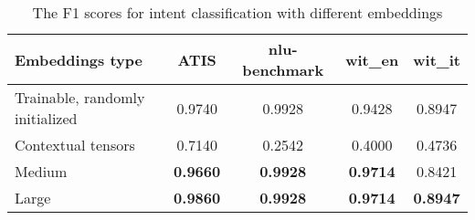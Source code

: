
\begin{table}
	\begin{tabularx}{\textwidth}{Lcccc}
		\toprule
		\textbf{Embeddings type} & \textbf{ATIS} & \textbf{nlu-benchmark} & \textbf{wit\_en} & \textbf{wit\_it} \\
		\midrule
		Trainable, randomly initialized & 0.9740 & 0.9928 & 0.9428 & 0.8947 \\
		\midrule
		Contextual tensors & 0.7140 & 0.2542 & 0.4000 & 0.4736 \\
		\midrule
		Medium & \textbf{0.9660} & \textbf{0.9928} &\textbf{0.9714} & 0.8421 \\
		\midrule
		Large & \textbf{0.9860} & \textbf{0.9928} & \textbf{0.9714} & \textbf{0.8947} \\
		\bottomrule
	\end{tabularx}
	\caption{The F1 scores for intent classification with different embeddings}\label{tab:intentsEmbeddingsChoice}
\end{table}